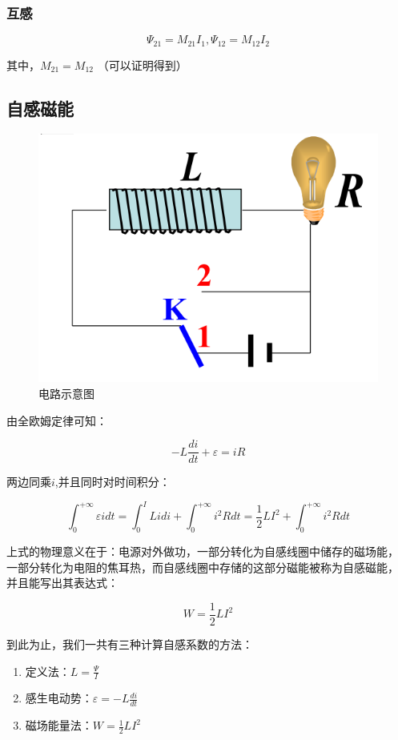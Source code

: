 \documentclass{ctexart}
\begin{document}
\subsubsection{互感}

$$\Psi_{21}=M_{21}I_1, \Psi_{12}=M_{12}I_2$$

其中，$M_{21}=M_{12}$ （可以证明得到）

\subsection{自感磁能}

\begin{figure}[h]
	\centering
	\includegraphics[scale=0.3]{images//chapter_14//figure_14.2.jpg} 
	\caption{电路示意图}\label{figure14.2}
\end{figure}

由全欧姆定律可知：

$$-L\frac{di}{dt}+\varepsilon=iR$$

两边同乘$i$,并且同时对时间积分：

$$\int_{0}^{+\infty}\varepsilon idt=\int_{0}^{I}Lidi+\int_{0}^
{+\infty}i^2Rdt=\frac{1}{2}LI^2+\int_{0}^{+\infty}i^2Rdt$$

上式的物理意义在于：电源对外做功，一部分转化为自感线圈中储存的磁场能，
一部分转化为电阻的焦耳热，而自感线圈中存储的这部分磁能被称为自感磁能，
并且能写出其表达式：

$$W=\frac{1}{2}LI^2$$

到此为止，我们一共有三种计算自感系数的方法：

\begin{enumerate}
	\item 定义法：$L=\frac{\Psi}{I}$
	
	\item 感生电动势：$\varepsilon=-L\frac{di}{dt}$
	
	\item 磁场能量法：$W=\frac{1}{2}LI^2$
\end{enumerate}
\end{document}
